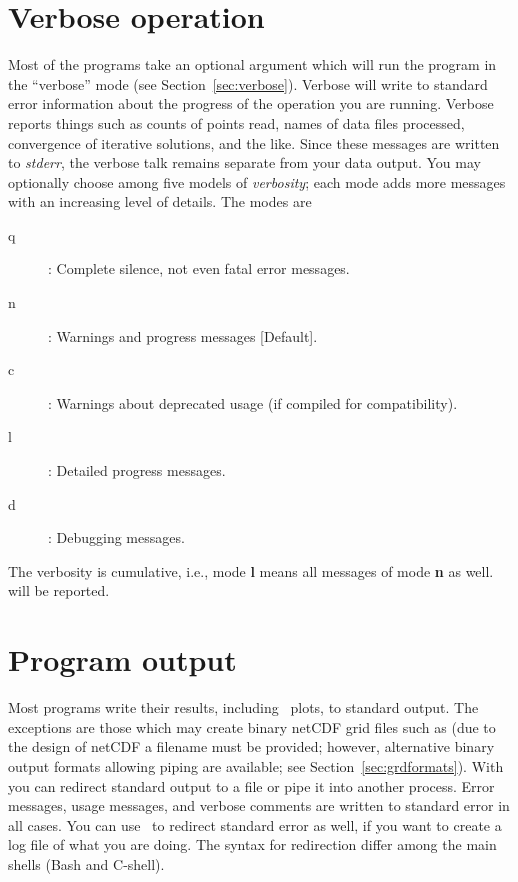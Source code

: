 \section{Verbose operation}

Most of the programs take an optional  argument
which will run the program in the ``verbose'' mode (see Section~\ref{sec:verbose}).
Verbose will write to standard error information about the progress
of the operation you are running.  Verbose reports things
such as counts of points read, names of data files
processed, convergence of iterative solutions, and the like.
Since these messages are written to \emph{stderr},  the
verbose talk remains separate from your data output.
You may optionally choose among five models of \emph{verbosity}; each mode
adds more messages with an increasing level of details.  The modes are
\begin{description}
	\item [q]: Complete silence, not even fatal error messages.
	\item [n]: Warnings and progress messages [Default].
	\item [c]: Warnings about deprecated usage (if compiled for compatibility).
	\item [l]: Detailed progress messages.
	\item [d]: Debugging messages.
\end{description}
The verbosity is cumulative, i.e., mode {\bf l} means all messages of mode {\bf n} as well.
will be reported.

\section{Program output}

Most programs write their results, including \PS\
plots, to standard output.  The exceptions are those which may
create binary netCDF grid files such as  (due to
the design of netCDF a filename must be provided; however,
alternative binary output formats allowing piping are available; see Section~\ref{sec:grdformats}).
With \UNIX\, you can redirect standard output to a file or pipe it
into another process.  Error messages, usage messages, and
verbose comments are written to standard error in all cases.
You can use \UNIX\ to redirect standard error as well,
if you want to create a log file of what you are doing.
The syntax for redirection differ among the main shells (Bash and C-shell).

